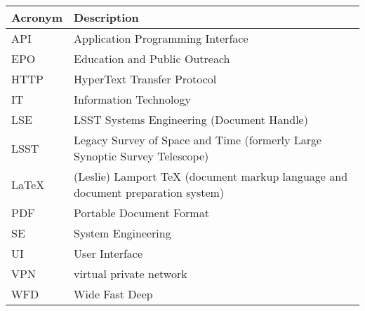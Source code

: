 \addtocounter{table}{-1}
\begin{longtable}{p{}p{}}\hline
\textbf{Acronym} & \textbf{Description}  \\\hline

API & Application Programming Interface \\\hline
EPO & Education and Public Outreach \\\hline
HTTP & HyperText Transfer Protocol \\\hline
IT & Information Technology \\\hline
LSE & LSST Systems Engineering (Document Handle) \\\hline
LSST & Legacy Survey of Space and Time (formerly Large Synoptic Survey Telescope) \\\hline
LaTeX & (Leslie) Lamport TeX (document markup language and document preparation system) \\\hline
PDF & Portable Document Format \\\hline
SE & System Engineering \\\hline
UI & User Interface \\\hline
VPN & virtual private network \\\hline
WFD & Wide Fast Deep \\\hline
\end{longtable}
